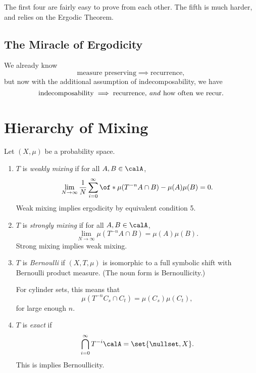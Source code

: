 \documentclass{article}
\theoremstyle{remark}
\begin{document}
The first four are fairly easy to prove
from each other. The fifth is much harder, and 
relies on the Ergodic Theorem.

\subsection{The Miracle of Ergodicity}

We already know 
\[ \text{measure preserving} \implies \text{recurrence}, \]
but now with the additional assumption of
indecomposability, we have
\[ \text{indecomposability} \implies \text{recurrence, \emph{and} 
how often we recur.}\]

\section{Hierarchy of Mixing}

Let $(X,\mu)$ be a probability space.

\begin{enumerate}
    \item $T$ is \emph{weakly mixing} if for all 
        $A,B\in \calA$,
        \[\lim_{N\to\infty}
        \frac{1}{N} \sum_{i=0}^\infty
        \of*{\mu(T^{-n}A\cap B)-\mu(A)\mu(B)}
        = 0.
        \]
        Weak mixing implies ergodicity by equivalent
        condition 5.
    \item $T$ is \emph{strongly mixing} if for all $A,B\in\calA$,
        \[ \lim_{N\to\infty}
            \mu(T^{-n}A\cap B) = \mu(A)\mu(B).
        \]
        Strong mixing implies weak mixing.
    \item $T$ is \emph{Bernoulli} if $(X,T,\mu)$ is 
        isomorphic to a full symbolic shift with
        Bernoulli product measure.
        (The noun form is Bernoullicity.)

        For cylinder sets, this means that 
        \[ \mu(T^{-n}C_s\cap C_t) = \mu(C_s)\mu(C_t),\]
        for large enough $n$.
    \item $T$ is \emph{exact} if 
        \[ \bigcap_{i=0}^\infty T^{-i}\calA 
        = \set{\nullset,X}. \]
        This is implies Bernoullicity.
\end{enumerate}
\end{document}
